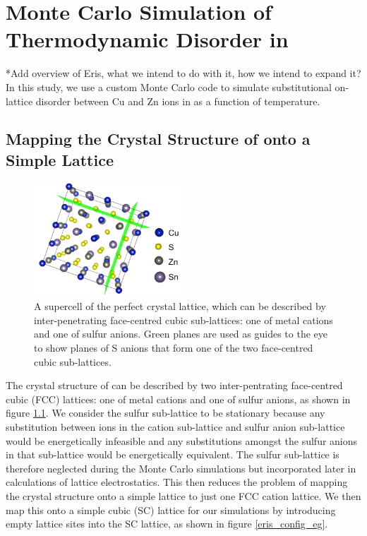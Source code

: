 \chapter{Monte Carlo Simulation of Thermodynamic Disorder in \CZTS}\label{MC_section}

*Add overview of Eris, what we intend to do with it, how we intend to expand it?\\

In this study, we use a custom Monte Carlo code to simulate substitutional on-lattice disorder between Cu and Zn ions in {\CZTS } as a function of temperature. 


\section{Mapping the Crystal Structure of { \CZTS } onto a Simple Lattice}

\begin{figure}[h!]
  \centering
    \includegraphics[width=0.5\textwidth]{figures/CZTS_lattice_mapping.png}
    \caption{A supercell of the perfect{ \CZTS } crystal lattice, which can be described by inter-penetrating face-centred cubic sub-lattices: one of metal cations and one of sulfur anions. Green planes are used as guides to the eye to show planes of S anions that form one of the two face-centred cubic sub-lattices.}
  \label{CZTS_lattice_mapping}
\end{figure}

The crystal structure of {\CZTS } can be described by two inter-pentrating face-centred cubic (FCC) lattices: one of metal cations and one of sulfur anions, as shown in figure \ref{CZTS_lattice_mapping}. We consider the sulfur sub-lattice to be stationary because any substitution between ions in the cation sub-lattice and sulfur anion sub-lattice would be energetically infeasible and any substitutions amongst the sulfur anions in that sub-lattice would be energetically equivalent. The sulfur sub-lattice is therefore neglected during the Monte Carlo simulations but incorporated later in calculations of lattice electrostatics. This then reduces the problem of mapping the {\CZTS } crystal structure onto a simple lattice to just one FCC cation lattice. We then map this onto a simple cubic (SC) lattice for our simulations by introducing empty lattice sites into the SC lattice, as shown in figure \ref{eris_config_eg}. \\

